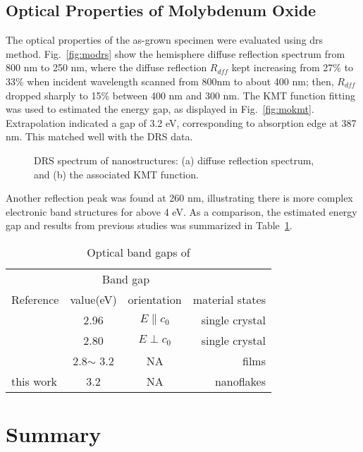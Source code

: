 \subsection{Optical Properties of Molybdenum Oxide}

%
The optical properties of the as-grown specimen were evaluated using \gls{drs} method. Fig.~\ref{fig:modrs} show the hemisphere diffuse reflection spectrum from 800 nm to 250 nm, where the diffuse reflection $R_{dff}$ kept increasing from 27\% to 33\% when incident wavelength scanned from 800nm to about 400 nm; then, $R_{dff}$ dropped sharply to 15\% between 400 nm and 300 nm. The KMT function fitting was used to estimated the energy gap, as displayed in Fig.~\ref{fig:mokmt}. Extrapolation indicated a gap of 3.2 eV, corresponding to absorption edge at 387 nm. This matched well with the DRS data.
\begin{figure}[htb]
\centering
{}\hspace{0.04\textwidth}
\caption[DRS spectrum of  nanostructures]{DRS spectrum of  nanostructures: (a) diffuse reflection spectrum, and (b) the associated KMT function.}
\label{fig:moo3drs}
\end{figure}
Another reflection peak was found at 260 nm, illustrating there is more complex electronic band structures for  above 4 eV. As a comparison, the estimated energy gap and results from previous studies was summarized in Table~\ref{tab:mobg}.
\begin{table}[htb]
\centering
\caption{Optical band gaps of }\label{tab:mobg}
\begin{tabular}{lccr}
\toprule
&\multicolumn{2}{c}{Band gap} \\
\cmidrule(l){2-3}
Reference & value(eV) & orientation & material states\\
\midrule
\cite{Deb1968}   & 2.96  & $E\parallel c_0$ & single crystal\\
\cite{Deb1968}   & 2.80  & $E\perp c_0$ & single crystal \\
\cite{Julien1995} & 2.8$\sim$ 3.2 & NA & films\\
 this work  & 3.2  & NA & nanoflakes\\
\bottomrule
\end{tabular}
\end{table}

\section{Summary}


